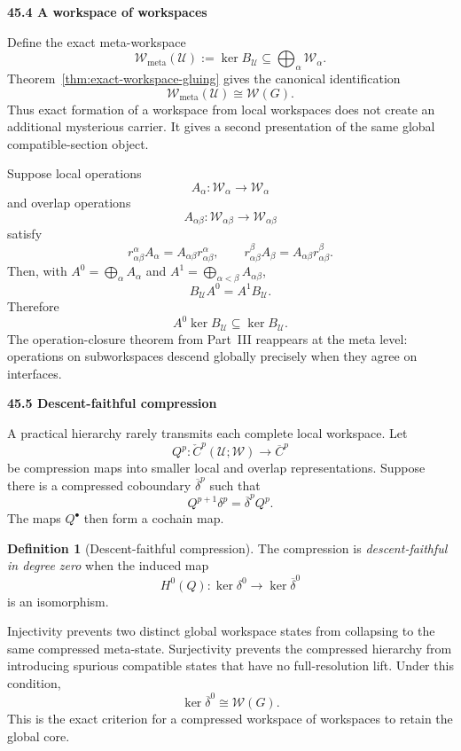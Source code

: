 \documentclass[11pt,letterpaper]{article}
\newcommand{\subtopic}[1]{%
 \vspace{0.45em}
 {\bfseries\color{AccentColor} #1\par}
}
\theoremstyle{plain}
\theoremstyle{definition}
\newtheorem{definition}[theorem]{Definition}
\begin{document}
\subtopic{45.4 A workspace of workspaces}

Define the exact meta-workspace
\[
\boxed{
\mathscr W_{\mathrm{meta}}(\mathcal U)
:=
\ker B_{\mathcal U}
\subseteq
\bigoplus_\alpha\mathscr W_\alpha.
}
\]
Theorem~\ref{thm:exact-workspace-gluing} gives the canonical identification
\[
\boxed{
\mathscr W_{\mathrm{meta}}(\mathcal U)
\cong
\mathscr W(G).
}
\]
Thus exact formation of a workspace from local workspaces does not create an
additional mysterious carrier. It gives a second presentation of the same
global compatible-section object.

Suppose local operations
\[
A_\alpha:\mathscr W_\alpha\to\mathscr W_\alpha
\]
and overlap operations
\[
A_{\alpha\beta}:\mathscr W_{\alpha\beta}\to
\mathscr W_{\alpha\beta}
\]
satisfy
\[
r_{\alpha\beta}^{\alpha}A_\alpha
=
A_{\alpha\beta}r_{\alpha\beta}^{\alpha},
\qquad
r_{\alpha\beta}^{\beta}A_\beta
=
A_{\alpha\beta}r_{\alpha\beta}^{\beta}.
\]
Then, with \(A^0=\bigoplus_\alpha A_\alpha\) and
\(A^1=\bigoplus_{\alpha<\beta}A_{\alpha\beta}\),
\[
B_{\mathcal U}A^0=A^1B_{\mathcal U}.
\]
Therefore
\[
A^0\ker B_{\mathcal U}\subseteq\ker B_{\mathcal U}.
\]
The operation-closure theorem from Part~III reappears at the meta level:
operations on subworkspaces descend globally precisely when they agree on
interfaces.

\subtopic{45.5 Descent-faithful compression}

A practical hierarchy rarely transmits each complete local workspace. Let
\[
Q^p:\check C^p(\mathcal U;\mathscr W)\to\overline C^p
\]
be compression maps into smaller local and overlap representations. Suppose
there is a compressed coboundary \(\overline\delta^p\) such that
\[
\boxed{
Q^{p+1}\delta^p
=
\overline\delta^p Q^p.
}
\]
The maps \(Q^\bullet\) then form a cochain map.

\begin{definition}[Descent-faithful compression]\label{def:descent-faithful}
The compression is \emph{descent-faithful in degree zero} when the induced map
\[
\boxed{
H^0(Q):
\ker\delta^0
\longrightarrow
\ker\overline\delta^0
}
\]
is an isomorphism.
\end{definition}

Injectivity prevents two distinct global workspace states from collapsing to
the same compressed meta-state. Surjectivity prevents the compressed hierarchy
from introducing spurious compatible states that have no full-resolution
lift. Under this condition,
\[
\boxed{
\ker\overline\delta^0
\cong
\mathscr W(G).
}
\]
This is the exact criterion for a compressed workspace of workspaces to retain
the global core.
\end{document}
